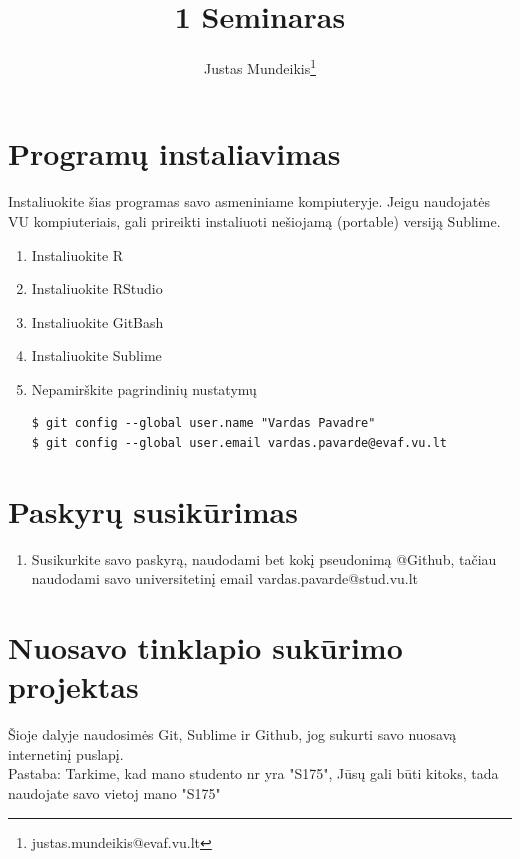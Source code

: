 \documentclass[12pt,a4paper]{article}
\author{Justas Mundeikis\thanks{justas.mundeikis@evaf.vu.lt}}
\title{1 Seminaras}
\begin{document}
\maketitle
\section{Programų instaliavimas}
Instaliuokite šias programas savo asmeniniame kompiuteryje. Jeigu naudojatės VU kompiuteriais, gali prireikti instaliuoti nešiojamą (portable) versiją Sublime.

\begin{enumerate}
\item Instaliuokite R
\item Instaliuokite RStudio
\item Instaliuokite GitBash
\item Instaliuokite Sublime
\item Nepamirškite pagrindinių nustatymų
\begin{lstlisting}
$ git config --global user.name "Vardas Pavadre"
$ git config --global user.email vardas.pavarde@evaf.vu.lt
\end{lstlisting}
\end{enumerate}

\section{Paskyrų susikūrimas}
\begin{enumerate}
\item Susikurkite savo paskyrą, naudodami bet kokį pseudonimą @Github, tačiau naudodami savo universitetinį email vardas.pavarde@stud.vu.lt
\end{enumerate}

\section{Nuosavo tinklapio sukūrimo projektas}
Šioje dalyje naudosimės Git, Sublime ir Github, jog sukurti savo nuosavą internetinį puslapį. 
\\Pastaba: Tarkime, kad mano studento nr yra "S175", Jūsų gali būti kitoks, tada naudojate savo vietoj mano "S175"
\end{document}
